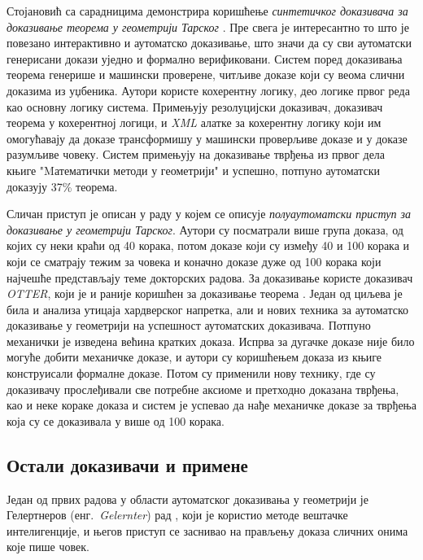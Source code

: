 Стојановић са сарадницима демонстрира коришћење \emph{синтетичког
  доказивача за доказивање теорема у геометрији Тарског}
\cite{dhurdjevic2015automated}. Пре свега је интересантно то што је
повезано интерактивно и аутоматско доказивање, што значи да су сви
аутоматски генерисани докази уједно и формално верификовани. Систем
поред доказивања теорема генерише и машински проверене, читљиве доказе
који су веома слични доказима из уџбеника. Аутори користе кохерентну
логику, део логике првог реда као основну логику система. Примењују
резолуцијски доказивач, доказивач теорема у кохерентној логици, и
\emph{XML} алатке за кохерентну логику који им омогућавају да доказе
трансформишу у машински проверљиве доказе и у доказе разумљиве
човеку. Систем примењују на доказивање тврђења из првог дела књиге
"Mатематички методи у геометрији" \cite{tarski} и успешно, потпуно
аутоматски доказују 37\% теорема.

Сличан приступ је описан у раду \cite{beesonfinding} у којем  се описује
\emph{полуаутоматски приступ за доказивање у геометрији
  Тарског}. Аутори су посматрали више група доказа, од којих су неки
краћи од 40 корака, потом доказе који су између 40 и 100 корака и који
се сматрају тежим за човека и коначно доказе дуже од 100 корака који
најчешће представљају теме докторских радова. За доказивање користе
доказивач \emph{OTTER}, који је и раније коришћен за доказивање теорема
\cite{quaife1992automated}. Један од циљева је била и анализа утицаја
хардверског напретка, али и нових техника за аутоматско доказивање у
геометрији на успешност аутоматских доказивача. Потпуно механички је
изведена већина кратких доказа. Испрва за дугачке доказе није било
могуће добити механичке доказе, и аутори су коришћењем доказа из књиге
конструисали формалне доказе. Потом су применили нову технику, где су
доказивачу прослеђивали све потребне аксиоме и претходно доказана
тврђења, као и неке кораке доказа и систем је успевао да нађе
механичке доказе за тврђења која су се доказивала у више од 100
корака.

\subsection{Остали доказивачи и примене}

Један од првих радова у области аутоматског доказивања у геометрији је
Гелертнеров (енг.~\emph{Gelernter}) рад \cite{gelernter1959}, који је
користио методе вештачке интелигенције, и његов приступ се заснивао на
прављењу доказа сличних онима које пише човек. 

